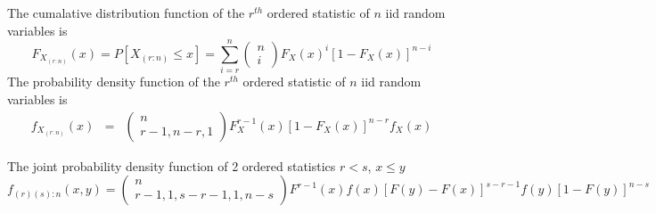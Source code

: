 \documentclass{article}
\begin{document}

The cumalative distribution function of the $r^{th}$ ordered statistic of $n$ iid random variables is \cite{ordered_stat}
\[
F_{X_{(r:n)}}(x) = P[X_{(r:n)} \leq x] 
= \sum_{i=r}^n 
                 \left(\begin{matrix} n \\ i \end{matrix}\right)
                 F_X(x)^i[1-F_X(x)]^{n-i}
\]
The probability density function of the $r^{th}$ ordered statistic of $n$ iid random variables is \cite{ordered_stat}
\begin{eqnarray*}
f_{X_{(r:n)}}(x) 
&=& \left(\begin{matrix} n \\ r-1, n-r, 1 \end{matrix}\right) F_X^{r-1}(x) [1-F_X(x)]^{n-r} f_X(x)
\end{eqnarray*}


The joint probability density function of 2 ordered statistics $r<s$, $x\leq y$ \cite{ordered_stat}
\[
f_{(r)(s):n} (x,y)
= \left(\begin{matrix} n \\ r-1, 1, s-r-1, 1, n-s \end{matrix}\right)
F^{r-1}(x) f(x) [F(y)-F(x)]^{s-r-1}f(y)[1-F(y)]^{n-s}
\]
\end{document}
